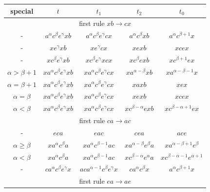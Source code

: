 \documentclass{article}
\theoremstyle{definition}
\begin{document}
\begin{center}
\begin{tabular}{|c|c|c|c|c|}
\hline
special & $t$ & $t_1$ & $t_2$ & $t_0$ \\
\hline
\hline
\multicolumn{5}{|c|}{first rule $xb \rightarrow cx$}\\
\hline
\hline
- & $   a^\alpha c^\beta e^\gamma x b  $ &  $  a^\alpha c^\beta e^\gamma c x  $ &   $  a^\alpha c^\beta x b  $ &  $ a^\alpha c^{\beta+1} x  $ \\
\hline
- & $x e^{\gamma} x b  $ &  $  x e^{\gamma} c x  $ &   $   x e x b  $ &  $ x c e x    $ \\
\hline
- & $x c^\beta e^\gamma x b$ &  $   x c^\beta e^\gamma x c  x    $ &   $  x  c^\beta e x b  $ &  $ x c^{\beta+1} e x  $ \\
\hline
$\alpha > \beta+1$ & $ x a^\alpha c^\beta e^\gamma x b  $ &  $  x a^\alpha c^{\beta} e^\gamma c x   $ &   $   x a^{\alpha-\beta} x b  $ &  $ x a^{\alpha-\beta-1} x    $ \\
\hline
$\alpha = \beta+1$ & $  x a^\alpha c^\beta  e^\gamma x b  $ &  $    x a^\alpha c^\beta  e^\gamma c  x  $ &   $   x a x b  $ &  $ x e x    $ \\
\hline
$\alpha = \beta$  & $  x a^\alpha c^\beta e^\gamma x b $ &  $   x a^\alpha c^\beta  e^\gamma  c  x  $ &   $   x e x b  $ &  $ x c e x    $ \\
\hline
$\alpha < \beta$  & $  x a^\alpha c^\beta e^\gamma x b $ &  $   x a^\alpha c^\beta  e^\gamma c  x  $ &   $   x c^{\beta-\alpha} e x b  $ &  $ x c^{\beta-\alpha+1}e x    $ \\
\hline
\hline
\multicolumn{5}{|c|}{first rule $ca \rightarrow ac$}\\
\hline
\hline
-& $ eca $ &  $  eac  $ &   $ cea  $ &  $ ace $ \\
\hline
$\alpha \ge \beta$ & $ x a^\alpha c^\beta a  $ &  $  x a^\alpha c^{\beta-1} a c  $ &   $   x a^{\alpha - \beta} e^\beta a    $ &  $ x a^{\alpha-\beta+1} e^{\beta}     $ \\
\hline
$\alpha < \beta$ & $ x a^\alpha c^\beta a  $ &  $  x a^\alpha c^{\beta-1} a c  $ &   $   x c^{\beta-\alpha} e^{\alpha} a    $ &  $ x c^{\beta-\alpha-1} e^{\alpha+1}     $ \\
\hline
- & $  c a^\alpha c^\beta e^\gamma x   $ &  $  a c a^{\alpha-1} c^\beta e^\gamma x  $ &   $ c a^\alpha c^\beta x   $ &  $ a^\alpha c^{\beta+1} x  $ \\
\hline
\hline
\multicolumn{5}{|c|}{first rule $ea \rightarrow ae$}\\

\end{tabular}
\end{center}
\end{document}
